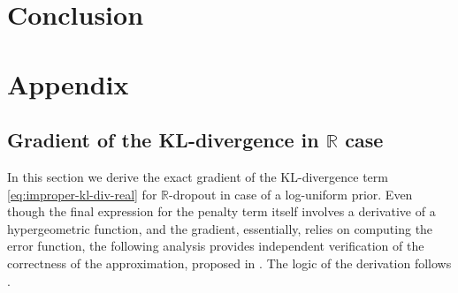 \documentclass[a4paper,10pt]{article}
\newcommand{\real}{\mathbb{R}}
\begin{document}


\section{Conclusion} %
\label{sec:conclusion}


\clearpage




\clearpage

\section{Appendix} %
\label{sec:appendix}

\subsection{Gradient of the KL-divergence in $\real$ case} %
\label{sub:real-chisq-grad}  %

In this section we derive the exact gradient of the KL-divergence term \eqref{eq:improper-kl-div-real}
for $\mathbb{R}$-dropout in case of a log-uniform prior. Even though the final expression for
the penalty term itself involves a derivative of a hypergeometric function, and the gradient,
essentially, relies on computing the error function, the following analysis provides independent
verification of the correctness of the approximation, proposed in \cite{molchanov_variational_2017}.
The logic of the derivation follows \cite{lapidoth_capacity_2003}.
\end{document}
